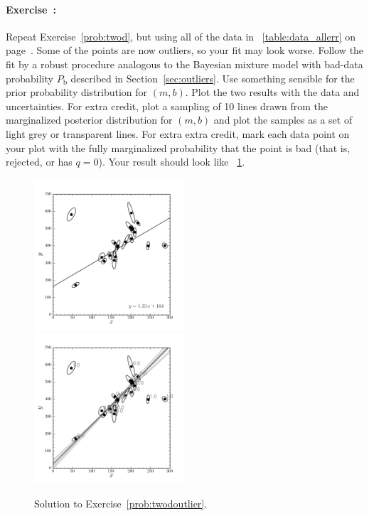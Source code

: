 \documentclass[12pt,twoside]{article}
\newcommand{\sectionname}{Section}
\newcommand{\problemname}{Exercise}
\newcounter{problem}
\newenvironment{problem}{\paragraph{\problemname~\theproblem:}\refstepcounter{problem}}{}
\newcommand{\Pbad}{P_{\mathrm{b}}}
\begin{document}
\begin{problem}\label{prob:twodoutlier}
Repeat \problemname~\ref{prob:twod}, but using all of the data in
\tablename~\ref{table:data_allerr} on
page~\pageref{table:data_allerr}.  Some of the points are now
outliers, so your fit may look worse.  Follow the fit by a robust
procedure analogous to the Bayesian mixture model with bad-data
probability $\Pbad$ described in \sectionname~\ref{sec:outliers}.  Use
something sensible for the prior probability distribution for $(m,b)$.
Plot the two results with the data and uncertainties.  For extra
credit, plot a sampling of 10 lines drawn from the marginalized
posterior distribution for $(m,b)$ and plot the samples as a set of
light grey or transparent lines.  For extra extra credit, mark each
data point on your plot with the fully marginalized probability that
the point is bad (that is, rejected, or has $q=0$).  Your result
should look like \figurename~\ref{fig:twodoutlier}.
\end{problem}

\begin{figure}[htb]
\includegraphics[width=0.5\textwidth]{ex13a.png}
\includegraphics[width=0.5\textwidth]{ex13b.png}
\caption{Solution to \problemname~\ref{prob:twodoutlier}.}\label{fig:twodoutlier}
\end{figure}
\end{document}
